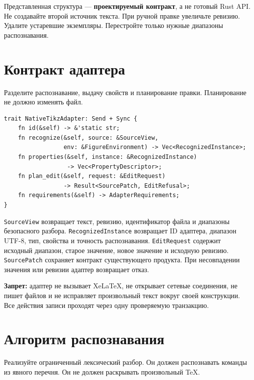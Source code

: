 \documentclass[11pt,a4paper,oneside]{scrreprt}
\begin{document}
Представленная структура --- \textbf{проектируемый контракт}, а не готовый Rust API. Не создавайте второй источник текста. При ручной правке увеличьте ревизию. Удалите устаревшие экземпляры. Перестройте только нужные диапазоны распознавания.

\section{Контракт адаптера}\label{ux43aux43eux43dux442ux440ux430ux43aux442-ux430ux434ux430ux43fux442ux435ux440ux430}

Разделите распознавание, выдачу свойств и планирование правки. Планирование не должно изменять файл.

\begin{verbatim}
trait NativeTikzAdapter: Send + Sync {
    fn id(&self) -> &'static str;
    fn recognize(&self, source: &SourceView,
                 env: &FigureEnvironment) -> Vec<RecognizedInstance>;
    fn properties(&self, instance: &RecognizedInstance)
                  -> Vec<PropertyDescriptor>;
    fn plan_edit(&self, request: &EditRequest)
                 -> Result<SourcePatch, EditRefusal>;
    fn requirements(&self) -> AdapterRequirements;
}
\end{verbatim}

\texttt{SourceView} возвращает текст, ревизию, идентификатор файла и диапазоны безопасного разбора. \texttt{RecognizedInstance} возвращает ID адаптера, диапазон UTF-8, тип, свойства и точность распознавания. \texttt{EditRequest} содержит исходный диапазон, старое значение, новое значение и исходную ревизию. \texttt{SourcePatch} сохраняет контракт существующего продукта. При несовпадении значения или ревизии адаптер возвращает отказ.

\textbf{Запрет:} адаптер не вызывает XeLaTeX, не открывает сетевые соединения, не пишет файлов и не исправляет произвольный текст вокруг своей конструкции. Все действия записи проходят через одну проверяемую транзакцию.

\section{Алгоритм распознавания}\label{ux430ux43bux433ux43eux440ux438ux442ux43c-ux440ux430ux441ux43fux43eux437ux43dux430ux432ux430ux43dux438ux44f}

Реализуйте ограниченный лексический разбор. Он должен распознавать команды из явного перечня. Он не должен раскрывать произвольный TeX.
\end{document}
